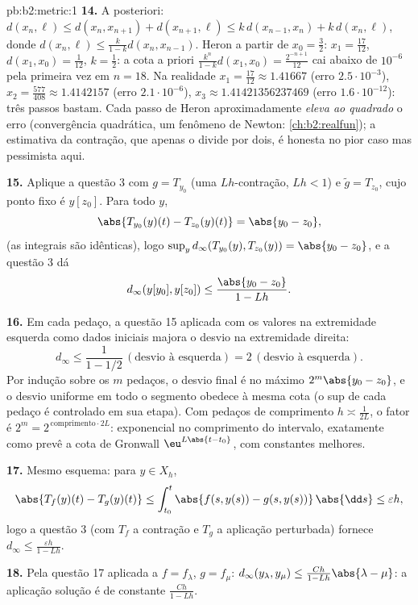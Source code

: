 \begin{solution}{pb:b2:metric:1}
\textbf{14.} A posteriori: $d(x_n, \ell) \leq d(x_n, x_{n+1}) +
d(x_{n+1}, \ell) \leq k\,d(x_{n-1}, x_n) + k\,d(x_n, \ell)$,
donde $d(x_n, \ell) \leq \frac{k}{1-k}d(x_n, x_{n-1})$. Heron
a partir de $x_0 = \frac32$: $x_1 = \frac{17}{12}$, $d(x_1, x_0) =
\frac1{12}$, $k = \frac12$: a cota a priori
$\frac{k^n}{1-k}d(x_1,x_0) = \frac{2^{-n+1}}{12}$ cai abaixo de
$10^{-6}$ pela primeira vez em $n = 18$. Na realidade $x_1 = \frac{17}{12}
\approx 1.41667$ (erro $2.5\cdot10^{-3}$), $x_2 =
\frac{577}{408} \approx 1.4142157$ (erro $2.1\cdot10^{-6}$),
$x_3 \approx 1.41421356237469$ (erro $1.6\cdot10^{-12}$):
três passos bastam. Cada passo de Heron aproximadamente \emph{eleva ao quadrado} o
erro (convergência quadrática, um fenômeno de Newton:
\cref{ch:b2:realfun}); a estimativa da contração, que apenas
o divide por dois, é honesta no pior caso mas pessimista aqui.

\textbf{15.} Aplique a questão 3 com $g = T_{y_0}$ (uma
$Lh$-contração, $Lh < 1$) e $\widetilde g = T_{z_0}$, cujo
ponto fixo é $y[z_0]$. Para todo $y$,
\[
\abs{T_{y_0}(y)(t) - T_{z_0}(y)(t)} = \abs{y_0 - z_0},
\]
(as integrais são idênticas), logo $\sup_y
d_\infty(T_{y_0}(y), T_{z_0}(y)) = \abs{y_0 - z_0}$, e a
questão 3 dá
\[
d_\infty(y[y_0], y[z_0]) \leq \frac{\abs{y_0 - z_0}}{1 - Lh} .
\]

\textbf{16.} Em cada pedaço, a questão 15 aplicada com os
valores na extremidade esquerda como dados iniciais majora o desvio na
extremidade direita:
\[
d_\infty \leq \frac{1}{1 - 1/2}\,(\text{desvio à esquerda})
= 2\,(\text{desvio à esquerda}) .
\] Por
indução sobre os $m$ pedaços, o desvio final é no máximo
$2^m\abs{y_0 - z_0}$, e o desvio uniforme em todo o
segmento obedece à mesma cota (o sup de cada pedaço é controlado em
sua etapa). Com pedaços de comprimento $h \asymp \frac1{2L}$, o
fator é $2^m = 2^{\,\text{comprimento}\cdot 2L}$: exponencial no
comprimento do intervalo, exatamente como prevê a cota de Gronwall
$\eu^{L\abs{t-t_0}}$, com constantes melhores.

\textbf{17.} Mesmo esquema: para $y \in X_h$,
\[
\abs{T_f(y)(t) - T_g(y)(t)} \leq \int_{t_0}^t \abs{f(s,y(s)) -
g(s,y(s))}\,\abs{\dd s} \leq \varepsilon h ,
\]
logo a questão 3 (com $T_f$ a contração e $T_g$ a aplicação
perturbada) fornece $d_\infty \leq \frac{\varepsilon h}{1 - Lh}$.

\textbf{18.} Pela questão 17 aplicada a $f = f_\lambda$, $g =
f_\mu$: $d_\infty(y_\lambda, y_\mu) \leq \frac{Ch}{1 -
Lh}\abs{\lambda - \mu}$: a aplicação solução é  de
constante $\frac{Ch}{1-Lh}$.


\end{solution}

